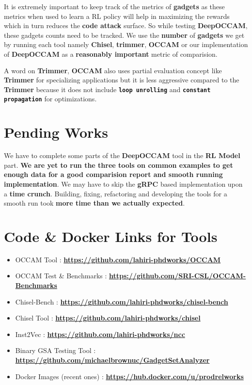 \documentclass{article} %
\begin{document}
It is extremely important to keep track of the metrics of \textbf{gadgets} as these metrics when used to learn a RL policy will help in maximizing the rewards which in turn reduces the \textbf{code attack} surface. So while testing \textbf{DeepOCCAM}, these gadgets counts need to be tracked. We use the \textbf{number} of \textbf{gadgets} we get by running each tool namely \textbf{Chisel}, \textbf{trimmer}, \textbf{OCCAM} or our implementation of \textbf{DeepOCCAM} as a \textbf{\color{ao(english)} reasonably important} metric of comparision. 

A word on \textbf{Trimmer}, \textbf{OCCAM} also uses partial evaluation concept like \textbf{Trimmer} for specializing applications but it is less aggressive compared to the  \textbf{Trimmer} because it does not include \textbf{\texttt{loop unrolling}} and \textbf{\texttt{constant propagation}} for optimizations.

\section*{\color{darkmidnightblue} Pending Works} 
We have to complete some parts of the \textbf{DeepOCCAM} tool in the \textbf{RL Model} part. \textbf{We are yet to run the three tools on common examples to get enough data for a good comparision report and smooth running implementation}. We may have to skip the \textbf{gRPC} based implementation upon a \textbf{time crunch}. Building, fixing, refactoring and developing the tools for a smooth run took \textbf{\color{red} more time than we actually expected}. 

\section*{Code \& Docker Links for Tools}
\begin{itemize}
	\item OCCAM Tool : \textbf{\href{https://github.com/lahiri-phdworks/OCCAM} {https://github.com/lahiri-phdworks/OCCAM}}
	\item OCCAM Test \& Benchmarks : \textbf{\href{https://github.com/lahiri-phdworks/OCCAM-Benchmarks} {https://github.com/SRI-CSL/OCCAM-Benchmarks}}
	\item Chisel-Bench : \textbf{\href{https://github.com/lahiri-phdworks/chisel-bench} {https://github.com/lahiri-phdworks/chisel-bench}}
	\item Chisel Tool : \textbf{\href{https://github.com/lahiri-phdworks/chisel} {https://github.com/lahiri-phdworks/chisel}}
	\item Inst2Vec : \textbf{\href{https://github.com/lahiri-phdworks/ncc} {https://github.com/lahiri-phdworks/ncc}}
	\item Binary GSA Testing Tool : \textbf{\href{https://github.com/michaelbrownuc/GadgetSetAnalyzer} {https://github.com/michaelbrownuc/GadgetSetAnalyzer}}
	\item Docker Images (recent ones) : \textbf{\href{https://hub.docker.com/u/prodrelworks} {https://hub.docker.com/u/prodrelworks}}
\end{itemize}
\end{document}
